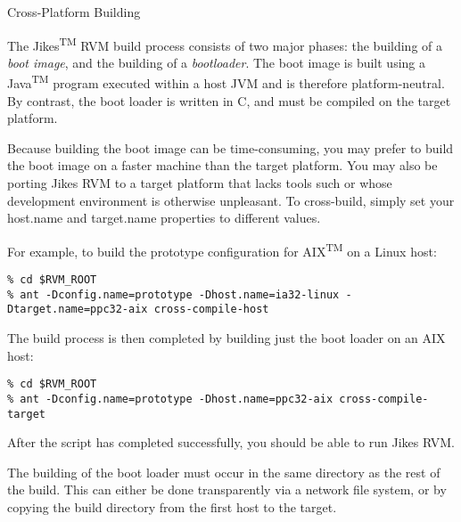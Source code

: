 \begin{section}{Cross-Platform Building}
\label{sec:crossplatformbuilding}

The Jikes\textsuperscript{TM} RVM build process consists of two major phases: the building of a \textit{boot image}, and the building of a \textit{bootloader}. The boot image is built using a Java\textsuperscript{TM} program executed within a host JVM and is therefore platform-neutral. By contrast, the boot loader is written in C, and must be compiled on the target platform.

Because building the boot image can be time-consuming, you may prefer to build the boot image on a faster machine than the target platform. You may also be porting Jikes RVM to a target platform that lacks tools such or whose development environment is otherwise unpleasant. To cross-build, simply set your host.name and target.name properties to different values.

For example, to build the prototype configuration for AIX\textsuperscript{TM} on a Linux host:
\begin{lstlisting}
% cd $RVM_ROOT
% ant -Dconfig.name=prototype -Dhost.name=ia32-linux -Dtarget.name=ppc32-aix cross-compile-host
\end{lstlisting}

The build process is then completed by building just the boot loader on an AIX host:
\begin{lstlisting}
% cd $RVM_ROOT
% ant -Dconfig.name=prototype -Dhost.name=ppc32-aix cross-compile-target
\end{lstlisting}

After the script has completed successfully, you should be able to run Jikes RVM.

The building of the boot loader must occur in the same directory as the rest of the build. This can either be done transparently via a network file system, or by copying the build directory from the first host to the target. 

\end{section}
